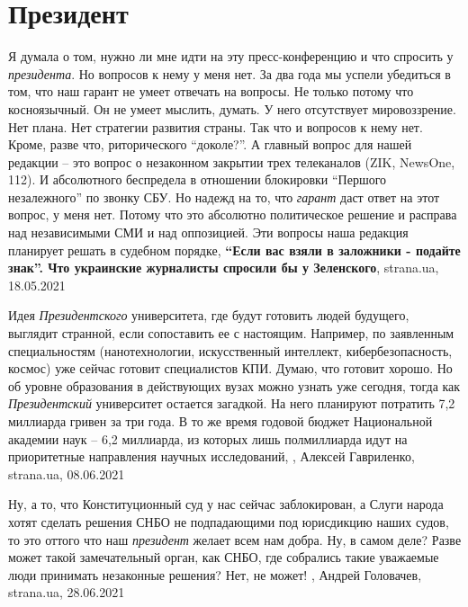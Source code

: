  
 
 
 
 
\chapter{Президент}
\label{sec:slova.prezident}

Я думала о том, нужно ли мне идти на эту пресс-конференцию и что спросить у
\emph{президента}. Но вопросов к нему у меня нет. За два года мы успели убедиться в
том, что наш гарант не умеет отвечать на вопросы. Не только потому что
косноязычный. Он не умеет мыслить, думать. У него отсутствует мировоззрение.
Нет плана. Нет стратегии развития страны. Так что и вопросов к нему нет. Кроме,
разве что, риторического \enquote{доколе?}.  А главный вопрос для нашей
редакции – это вопрос о незаконном закрытии трех телеканалов (ZIK, NewsOne,
112). И абсолютного беспредела в отношении блокировки \enquote{Першого
незалежного} по звонку СБУ. Но надежд на то, что \emph{гарант} даст ответ на этот
вопрос, у меня нет. Потому что это абсолютно политическое решение и расправа
над независимыми СМИ и над оппозицией. Эти вопросы наша редакция планирует
решать в судебном порядке,
\textbf{\enquote{Если вас взяли в заложники - подайте знак}. Что украинские журналисты спросили бы у Зеленского},
strana.ua, 18.05.2021

Идея \emph{Президентского} университета, где будут готовить людей будущего,
выглядит странной, если сопоставить ее с настоящим. Например, по заявленным
специальностям (нанотехнологии, искусственный интеллект, кибербезопасность,
космос) уже сейчас готовит специалистов КПИ. Думаю, что готовит хорошо. Но об
уровне образования в действующих вузах можно узнать уже сегодня, тогда как
\emph{Президентский} университет остается загадкой.  На него планируют
потратить 7,2 миллиарда гривен за три года. В то же время годовой бюджет
Национальной академии наук – 6,2 миллиарда, из которых лишь полмиллиарда идут
на приоритетные направления научных исследований,
, Алексей Гавриленко, strana.ua, 08.06.2021


Ну, а то, что Конституционный суд у нас сейчас заблокирован, а Слуги народа
хотят сделать решения СНБО не подпадающими под юрисдикцию наших судов, то это
оттого что наш \emph{президент} желает всем нам добра. Ну, в самом деле? Разве
может такой замечательный орган, как СНБО, где собрались такие уважаемые люди
принимать незаконные решения? Нет, не может!
, 
Андрей Головачев, strana.ua, 28.06.2021
